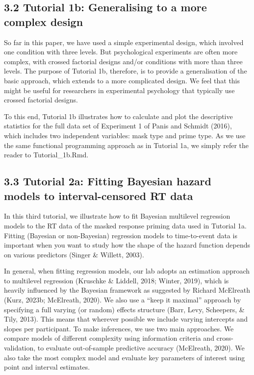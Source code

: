\documentclass[
  man, donotrepeattitle,floatsintext]{apa6}
\begin{document}
\subsection{3.2 Tutorial 1b: Generalising to a more complex design}\label{tutorial-1b-generalising-to-a-more-complex-design}

So far in this paper, we have used a simple experimental design, which involved one condition with three levels. But psychological experiments are often more complex, with crossed factorial designs and/or conditions with more than three levels. The purpose of Tutorial 1b, therefore, is to provide a generalisation of the basic approach, which extends to a more complicated design. We feel that this might be useful for researchers in experimental psychology that typically use crossed factorial designs.

To this end, Tutorial 1b illustrates how to calculate and plot the descriptive statistics for the full data set of Experiment 1 of Panis and Schmidt (2016), which includes two independent variables: mask type and prime type. As we use the same functional programming approach as in Tutorial 1a, we simply refer the reader to Tutorial\_1b.Rmd.

\subsection{3.3 Tutorial 2a: Fitting Bayesian hazard models to interval-censored RT data}\label{tutorial-2a-fitting-bayesian-hazard-models-to-interval-censored-rt-data}

In this third tutorial, we illustrate how to fit Bayesian multilevel regression models to the RT data of the masked response priming data used in Tutorial 1a. Fitting (Bayesian or non-Bayesian) regression models to time-to-event data is important when you want to study how the shape of the hazard function depends on various predictors (Singer \& Willett, 2003).

In general, when fitting regression models, our lab adopts an estimation approach to multilevel regression (Kruschke \& Liddell, 2018; Winter, 2019), which is heavily influenced by the Bayesian framework as suggested by Richard McElreath (Kurz, 2023b; McElreath, 2020). We also use a ``keep it maximal'' approach by specifying a full varying (or random) effects structure (Barr, Levy, Scheepers, \& Tily, 2013). This means that wherever possible we include varying intercepts and slopes per participant.
To make inferences, we use two main approaches. We compare models of different complexity using information criteria and cross-validation, to evaluate out-of-sample predictive accuracy (McElreath, 2020). We also take the most complex model and evaluate key parameters of interest using point and interval estimates.
\end{document}
